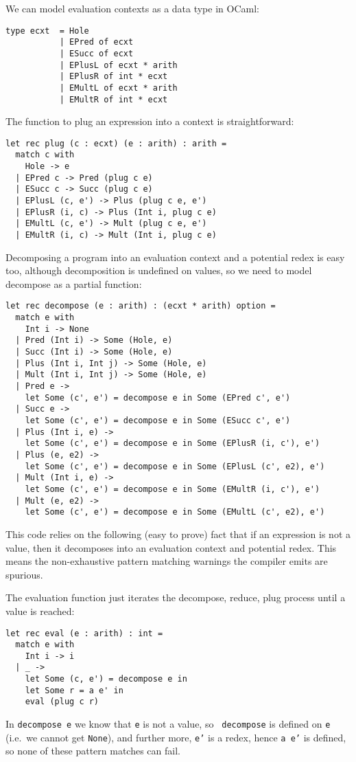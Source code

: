 We can model evaluation contexts as a data type in OCaml:
\begin{verbatim}
type ecxt  = Hole
           | EPred of ecxt
           | ESucc of ecxt
           | EPlusL of ecxt * arith
           | EPlusR of int * ecxt
           | EMultL of ecxt * arith
           | EMultR of int * ecxt
\end{verbatim}
The function to plug an expression into a context is straightforward:
\begin{verbatim}
let rec plug (c : ecxt) (e : arith) : arith =
  match c with
    Hole -> e
  | EPred c -> Pred (plug c e)
  | ESucc c -> Succ (plug c e)
  | EPlusL (c, e') -> Plus (plug c e, e')
  | EPlusR (i, c) -> Plus (Int i, plug c e)
  | EMultL (c, e') -> Mult (plug c e, e')
  | EMultR (i, c) -> Mult (Int i, plug c e)
\end{verbatim}
Decomposing a program into an evaluation context and a potential redex
is easy too, although decomposition is undefined on values, so we
need to model decompose as a partial function:
\begin{verbatim}
let rec decompose (e : arith) : (ecxt * arith) option =
  match e with
    Int i -> None
  | Pred (Int i) -> Some (Hole, e)
  | Succ (Int i) -> Some (Hole, e)
  | Plus (Int i, Int j) -> Some (Hole, e)
  | Mult (Int i, Int j) -> Some (Hole, e)
  | Pred e -> 
    let Some (c', e') = decompose e in Some (EPred c', e')
  | Succ e -> 
    let Some (c', e') = decompose e in Some (ESucc c', e')
  | Plus (Int i, e) -> 
    let Some (c', e') = decompose e in Some (EPlusR (i, c'), e')
  | Plus (e, e2) ->
    let Some (c', e') = decompose e in Some (EPlusL (c', e2), e')
  | Mult (Int i, e) -> 
    let Some (c', e') = decompose e in Some (EMultR (i, c'), e')
  | Mult (e, e2) -> 
    let Some (c', e') = decompose e in Some (EMultL (c', e2), e')
\end{verbatim}
This code relies on the following (easy to prove) fact that if an
expression is not a value, then it decomposes into an evaluation
context and potential redex.  This means the non-exhaustive pattern
matching warnings the compiler emits are spurious.

The evaluation function just iterates the decompose, reduce, plug
process until a value is reached:
\begin{verbatim}
let rec eval (e : arith) : int =
  match e with
    Int i -> i
  | _ -> 
    let Some (c, e') = decompose e in
    let Some r = a e' in
    eval (plug c r)
\end{verbatim}
In {\tt decompose e} we know that {\tt e} is not a value, so {\tt
  decompose} is defined on {\tt e} (i.e.~we cannot get {\tt None}),
and further more, {\tt e'} is a redex, hence {\tt a e'} is
defined, so none of these pattern matches can fail.

